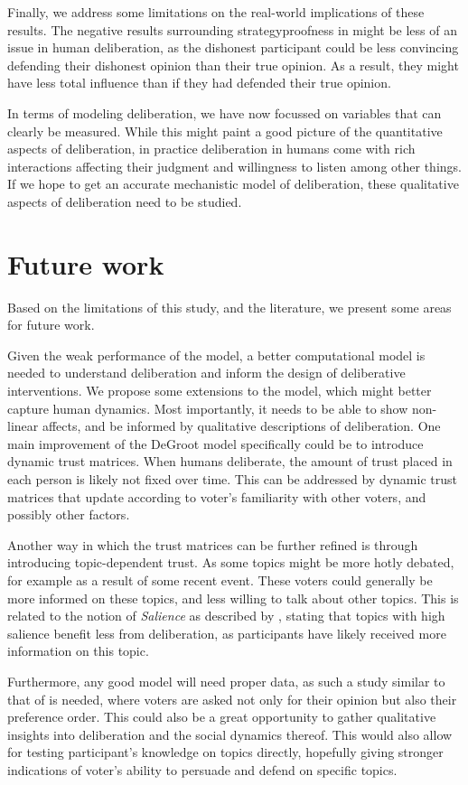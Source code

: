 Finally, we address some limitations on the real-world implications of these results.
The negative results surrounding strategyproofness in  might be less
of an issue in human deliberation, as the dishonest participant could be less convincing
defending their dishonest opinion than their true opinion. As a result, they might have less
total influence than if they had defended their true opinion.

In terms of modeling deliberation, we have now focussed on variables that can
clearly be measured. While this might paint a good picture of the quantitative
aspects of deliberation, in practice deliberation in humans come with rich interactions
affecting their judgment and willingness to listen among other things. If we hope to
get an accurate mechanistic model of deliberation, these qualitative aspects of deliberation
need to be studied.




\section{Future work}

Based on the limitations of this study, and the literature, we present some areas for future work.

Given the weak performance of the model, a better computational model is needed
to understand deliberation and inform the design of deliberative interventions.
We propose some extensions to the model, which might better capture human
dynamics. Most importantly, it needs to be able to show non-linear affects, and
be informed by qualitative descriptions of deliberation. One main improvement of the DeGroot model specifically could be to introduce dynamic trust matrices.
When humans deliberate, the amount of trust placed in each person is likely not
fixed over time. This can be addressed by dynamic trust matrices that update according
to voter's familiarity with other voters, and possibly other factors.

Another way in which the trust matrices can be further refined is through
introducing topic-dependent trust. As some topics might be more hotly debated,
for example as a result of some recent event. These voters could generally be
more informed on these topics, and less willing to talk about other topics.
This is related to the notion of \textit{Salience} as described by
\citet{listDeliberationSinglePeakednessPossibility2013}, stating that topics
with high salience benefit less from deliberation, as participants have likely
received more information on this topic.

Furthermore, any good model will need proper data, as such a study similar to
that of \citet{fishkinCanDeliberationHave2024} is needed, where voters are
asked not only for their opinion but also their preference order. This could
also be a great opportunity to gather qualitative insights into deliberation
and the social dynamics thereof. This would also allow for testing participant's
knowledge on topics directly, hopefully giving stronger indications of voter's ability
to persuade and defend on specific topics.

